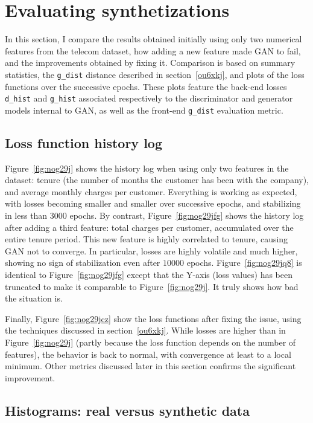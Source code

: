 \documentclass[oneside,10pt]{book}
\begin{document}
\section{Evaluating synthetizations}

In this section, I compare the results obtained initially using only two numerical features from the telecom dataset, how adding a new feature made GAN to fail, and the improvements obtained by fixing it. Comparison is based on summary statistics, the \texttt{g\_dist} distance described in
 section~\ref{ou6xkj}, and plots of the loss functions over the successive epochs. These plots feature the back-end losses
 \texttt{d\_hist} and \texttt{g\_hist} associated respectively to the discriminator and generator models internal to GAN, as well as the
front-end \texttt{g\_dist} evaluation metric.

\subsection{Loss function history log}

Figure~\ref{fig:nog29j} shows the history log when using only two features in the dataset: tenure (the number of months the customer has been
 with the company), and average monthly charges per customer. Everything is working as expected, with losses becoming smaller and smaller over
 successive epochs, and stabilizing in less than 3000 epochs. By contrast, Figure~\ref{fig:nog29jfg} shows the history log after adding a third feature: total charges per customer, accumulated over the entire tenure period.
This new feature is highly correlated to tenure, causing GAN not to converge. In particular, losses are highly volatile and much higher, showing no sign of stabilization even after $\num{10000}$ epochs. Figure~\ref{fig:nog29jq8} is identical to Figure~\ref{fig:nog29jfg} except that the Y-axis (loss values)
 has been truncated to make it comparable to Figure~\ref{fig:nog29j}. It truly shows how bad the situation is.



Finally, Figure~\ref{fig:nog29jcz} show the loss functions after fixing the issue, using the techniques discussed in
 section~\ref{ou6xkj}. While losses are higher than in Figure~\ref{fig:nog29j} (partly because the loss function depends on the number of features), the
 behavior is back to normal, with convergence at least to a local minimum. Other metrics discussed later in this section confirms the
 significant improvement.

\subsection{Histograms: real versus synthetic data}
\end{document}
